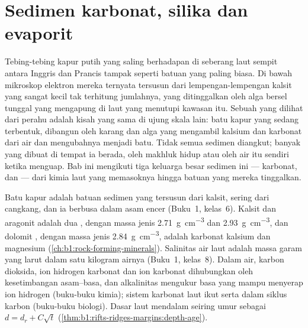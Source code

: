 \chapter{Sedimen karbonat, silika dan evaporit}\label{ch:b1:chemical-biogenic-sediments}

Tebing-tebing kapur putih yang saling berhadapan di seberang laut sempit antara Inggris dan Prancis tampak seperti batuan yang paling biasa. Di bawah mikroskop elektron mereka ternyata tersusun dari lempengan-lempengan kalsit yang sangat kecil tak terhitung jumlahnya, yang ditinggalkan oleh alga bersel tunggal yang mengapung di laut yang menutupi kawasan itu. Sebuah  yang dilihat dari perahu adalah kisah yang sama di ujung skala lain: batu kapur yang sedang terbentuk, dibangun oleh karang dan alga yang mengambil kalsium dan karbonat dari air dan mengubahnya menjadi batu. Tidak semua sedimen diangkut; banyak yang dibuat di tempat ia berada, oleh makhluk hidup atau oleh air itu sendiri ketika menguap. Bab ini mengikuti tiga keluarga besar sedimen ini --- karbonat,  dan  --- dari kimia laut yang memasoknya hingga batuan yang mereka tinggalkan.

\begin{recall}
Batu kapur adalah batuan sedimen yang tersusun dari kalsit, sering dari cangkang, dan ia berbusa dalam asam encer (Buku~1, kelas~6). Kalsit dan aragonit adalah dua  , dengan massa jenis \qty{2.71}{g.cm^{-3}} dan \qty{2.93}{g.cm^{-3}}, dan dolomit , dengan massa jenis \qty{2.84}{g.cm^{-3}}, adalah karbonat kalsium dan magnesium (\cref{ch:b1:rock-forming-minerals}). Salinitas air laut adalah massa garam yang larut dalam satu kilogram airnya (Buku~1, kelas~8). Dalam air, karbon dioksida, ion hidrogen karbonat dan ion karbonat dihubungkan oleh kesetimbangan asam--basa, dan alkalinitas mengukur basa yang mampu menyerap ion hidrogen (buku-buku kimia); sistem karbonat laut ikut serta dalam siklus karbon (buku-buku biologi). Dasar laut mendalam seiring umur sebagai $d = d_r + C\sqrt t$ (\cref{thm:b1:rifts-ridges-margins:depth-age}).
\end{recall}

